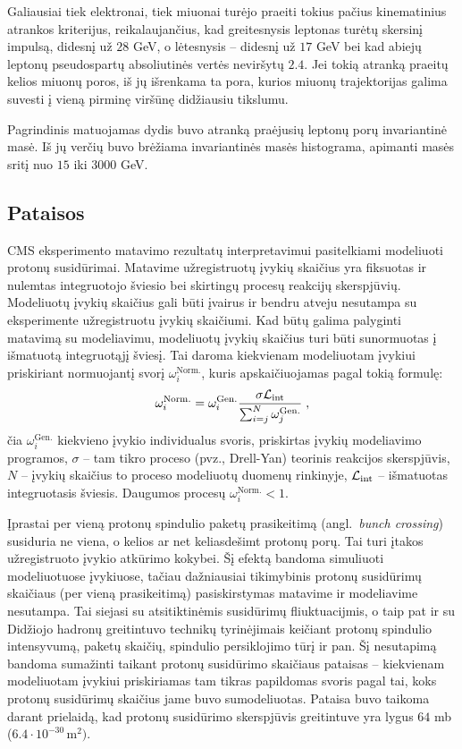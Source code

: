 \documentclass[a4paper, 12pt, oneside]{article}
\newcommand{\Lumi}{{\cal L}_\mathrm{int}}
\newlength\q
\begin{document}
Galiausiai tiek elektronai, tiek miuonai turėjo praeiti tokius pačius kinematinius atrankos kriterijus,
reikalaujančius, kad greitesnysis leptonas turėtų skersinį impulsą, didesnį už $28$ GeV, o lėtesnysis --
didesnį už $17$ GeV bei kad abiejų leptonų pseudospartų absoliutinės vertės neviršytų $2.4$.
Jei tokią atranką praeitų kelios miuonų poros, iš jų išrenkama ta pora, kurios miuonų trajektorijas galima suvesti į
vieną pirminę viršūnę didžiausiu tikslumu.

Pagrindinis matuojamas dydis buvo atranką praėjusių leptonų porų invariantinė masė.
Iš jų verčių buvo brėžiama invariantinės masės histograma, apimanti masės sritį nuo $15$ iki $3000$ GeV.

\subsection{Pataisos}\label{sec:corrections}
CMS eksperimento matavimo rezultatų interpretavimui pasitelkiami modeliuoti protonų susidūrimai.
Matavime užregistruotų įvykių skaičius yra fiksuotas ir nulemtas integruotojo šviesio bei skirtingų
procesų reakcijų skerspjūvių.
Modeliuotų įvykių skaičius gali būti įvairus ir bendru atveju nesutampa su eksperimente užregistruotu
įvykių skaičiumi.
Kad būtų galima palyginti matavimą su modeliavimu, modeliuotų įvykių skaičius turi būti sunormuotas
į išmatuotą integruotąjį šviesį.
Tai daroma kiekvienam modeliuotam įvykiui priskiriant normuojantį svorį $\omega_{i}^{\mathrm{Norm.}}$,
kuris apskaičiuojamas pagal tokią formulę:
\begin{equation}
	\omega_{i}^{\mathrm{Norm.}} = \omega_{i}^{\mathrm{Gen.}} \frac{ \sigma\Lumi }{ \sum_{i=j}^{N}\omega_{j}^{\mathrm{Gen.}} } \; ,
	\label{eq:NLOweight}
\end{equation}
čia $\omega_{i}^{\mathrm{Gen.}}$ kiekvieno įvykio individualus svoris, priskirtas įvykių modeliavimo programos,
$\sigma$ -- tam tikro proceso (pvz., Drell-Yan) teorinis reakcijos skerspjūvis, $N$ -- įvykių skaičius to
proceso modeliuotų duomenų rinkinyje, $\Lumi$ -- išmatuotas integruotasis šviesis.
Daugumos procesų $\omega_{i}^{\mathrm{Norm.}}<1$.

Įprastai per vieną protonų spindulio paketų prasikeitimą (angl.\ \textit{bunch crossing}) susiduria
ne viena, o kelios ar net keliasdešimt protonų porų.
Tai turi įtakos užregistruoto įvykio atkūrimo kokybei.
Šį efektą bandoma simuliuoti modeliuotuose įvykiuose, tačiau dažniausiai tikimybinis protonų susidūrimų
skaičiaus (per vieną prasikeitimą) pasiskirstymas matavime ir modeliavime nesutampa.
Tai siejasi su atsitiktinėmis susidūrimų fliuktuacijmis, o taip pat ir su Didžiojo hadronų greitintuvo
technikų tyrinėjimais keičiant protonų spindulio intensyvumą, paketų skaičių, spindulio persiklojimo
tūrį ir pan.
Šį nesutapimą bandoma sumažinti taikant protonų susidūrimo skaičiaus pataisas -- kiekvienam modeliuotam
įvykiui priskiriamas tam tikras papildomas svoris pagal tai, koks protonų susidūrimų skaičius jame buvo sumodeliuotas.
Pataisa buvo taikoma darant prielaidą, kad protonų susidūrimo skerspjūvis greitintuve yra lygus $64$ mb
($6.4 \cdot 10^{-30} \, \mathrm{m}^2)$.
\end{document}
